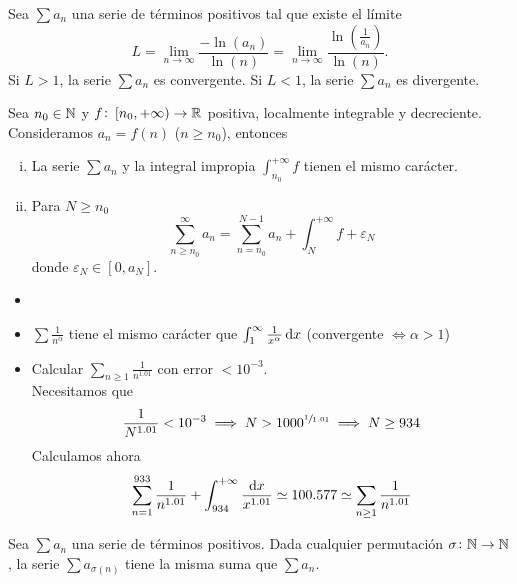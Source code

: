 \begin{prop}
    Sea $\sum a_n$ una serie de términos positivos tal que existe el límite
    \[
        L = \lim_{n \to \infty} \frac{- \ln(a_n)}{\ln(n)} = \lim_{n \to \infty}
        \frac{\ln\left( \frac{1}{a_n} \right)}{\ln(n)}.
    \]
    Si $L > 1$, la serie $\sum a_n$ es convergente. Si $L < 1$, la serie $\sum a_n$ es
    divergente.
\end{prop}

\begin{prop}
    Sea $n_0 \in \mathbb{N}$ y $f \colon \left[ n_0, +\infty \right) \to \mathbb{R}$ positiva, localmente integrable
    y decreciente. Consideramos $a_n = f(n)$ ($n \geq n_0$), entonces
    \begin{enumerate}[i)]
        \item La serie $\sum a_n$ y la integral impropia
        $\int_{n_0}^{+\infty} f$ tienen el mismo carácter.
        \item Para $N \geq n_0$
        \[
            \sum_{n \geq n_0}^{\infty} a_n = \sum_{n = n_0}^{N-1} a_n+ \int_{N}^{+\infty}f +
            \varepsilon_N
        \]
        donde $\varepsilon_N \in [0, a_N]$.
    \end{enumerate}
\end{prop}

\begin{example}
    \begin{itemize}
        \item[]
        \item $\sum \frac{1}{n^\alpha}$ tiene el mismo carácter que
            $\int_{1}^{\infty} \frac{1}{x^\alpha} \dif x$ (convergente $\iff \alpha > 1$)
        \item Calcular $\sum\limits_{n\geq 1} \frac{1}{n^{1.01}}$ con error $< 10^{-3}$. \\
            Necesitamos que
            \[
                \frac{1}{N^{1.01}} < 10^{-3} \implies N > 1000^{\sfrac{1}{1.01}} \implies
                N \geq 934
            \]
            Calculamos ahora
            \[
                \sum_{n=1}^{933} \frac{1}{n^{1.01}} + \int_{934}^{+\infty}
                \frac{\dif x}{x^{1.01}} \simeq 100.577 \simeq\sum_{n\geq 1}\frac{1}{n^{1.01}}
            \]
    \end{itemize}
\end{example}

\begin{prop}
    Sea $\sum a_n$ una serie de términos positivos. Dada cualquier permutación $\sigma
    \colon \mathbb{N} \to \mathbb{N}$, la serie $\sum a_{\sigma(n)}$ tiene la misma suma que $\sum a_n$.
\end{prop}

